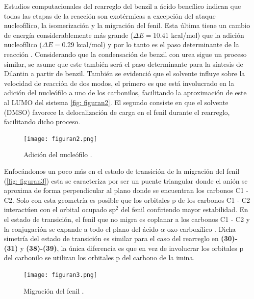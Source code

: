 \documentclass[fleqn,10pt]{SelfArx}
\begin{document}
Estudios computacionales del rearreglo del benzil a ácido bencílico indican que todas las etapas de la reacción son exotérmicas a excepción del ataque nucleofílico, la isomerizaci\'on y la migración del fenil. Esta última tiene un cambio de energía considerablemente más grande ($\Delta E=10.41$ kcal/mol) que la adición nucleofílico ($\Delta E = 0.29$ kcal/mol) y por lo tanto es el paso determinante de la reacción \cite{yamabe2006}. Considerando que la condensación de benzil con urea sigue un proceso similar, se asume que este también será el paso determinante para la síntesis de Dilantin a partir de benzil. También se evidenció que el solvente influye sobre la velocidad de reacción de dos modos, el primero es que está involucrado en la adición del nucleófilo a uno de los carbonilos, facilitando la aproximación de este al LUMO del sistema \autoref{fig: figuran2}. El segundo consiste en que el solvente (DMSO) favorece la delocalización de carga en el fenil durante el rearreglo, facilitando dicho proceso.
\begin{figure}[h]
	\centering
	\texttt{[image: figuran2.png]}
	\caption{Adici\'on del nucle\'ofilo \cite{yamabe2006}.}
	\label{fig: figuran2}
\end{figure}

Enfocándonos un poco más en el estado de transición de la migración del fenil (\autoref{fig: figuran3}) esta se caracteriza por ser un puente triangular \cite{yamabe2006}\cite{bowden1994} donde el anión se aproxima de forma perpendicular al plano donde se encuentran los carbonos C1 - C2.  Solo con esta geometría es posible que los orbitales p de los carbonos C1 - C2 interactúen con el orbital ocupado sp$^2$ del fenil confiriendo mayor estabilidad. En el estado de transición, el fenil que no migra es coplanar a los carbonos C1 - C2 y la conjugación se expande a todo el plano del ácido $\alpha$-oxo-carboxílico \cite{yamabe2006}. Dicha simetría del estado de transición es similar para el caso del rearreglo en \textbf{(30)-(31)} y \textbf{(38)-(39)}, la única diferencia es que en vez de involucrar los orbitales p del carbonilo se utilizan los orbitales p del carbono de la imina.
\begin{figure}[h]
	\centering
	\texttt{[image: figuran3.png]}
	\caption{Migraci\'on del fenil \cite{phelan1967}.}
	\label{fig: figuran3}
\end{figure}
\end{document}
